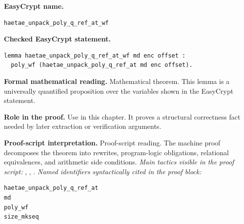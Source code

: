 \begin{formaltheorem}
\noindent\textbf{EasyCrypt name.}
\begin{lstlisting}[language=EasyCrypt,basicstyle=\ttfamily\scriptsize]
haetae_unpack_poly_q_ref_at_wf
\end{lstlisting}
\noindent\textbf{Checked EasyCrypt statement.}
\begin{lstlisting}[language=EasyCrypt,basicstyle=\ttfamily\scriptsize]
lemma haetae_unpack_poly_q_ref_at_wf md enc offset :
  poly_wf (haetae_unpack_poly_q_ref_at md enc offset).
\end{lstlisting}
\noindent\textbf{Formal mathematical reading.}
Mathematical theorem. This lemma is a universally quantified proposition over the variables shown in the EasyCrypt statement.

\noindent\textbf{Role in the proof.}
Use in this chapter. It proves a structural correctness fact needed by later extraction or verification arguments.

\noindent\textbf{Proof-script interpretation.}
Proof-script reading. The machine proof decomposes the theorem into rewrites, program-logic obligations, relational equivalences, and arithmetic side conditions.
\emph{Main tactics visible in the proof script:} , , .
\emph{Named identifiers syntactically cited in the proof block:}
\begin{lstlisting}[language=EasyCrypt,basicstyle=\ttfamily\scriptsize]
haetae_unpack_poly_q_ref_at
md
poly_wf
size_mkseq
\end{lstlisting}

\end{formaltheorem}

